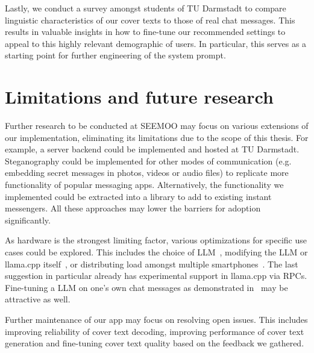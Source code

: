 Lastly, we conduct a survey amongst students of TU Darmstadt to compare linguistic characteristics of our cover texts to those of real chat messages. This results in valuable insights in how to fine-tune our recommended settings to appeal to this highly relevant demographic of users. In particular, this serves as a starting point for further engineering of the system prompt.

\section{Limitations and future research}
\label{sec:limitationsAndFutureResearch}
Further research to be conducted at SEEMOO may focus on various extensions of our implementation, eliminating its limitations due to the scope of this thesis. For example, a server backend could be implemented and hosted at TU Darmstadt. Steganography could be implemented for other modes of communication (e.g. embedding secret messages in photos, videos or audio files) to replicate more functionality of popular messaging apps. Alternatively, the functionality we implemented could be extracted into a library to add to existing instant messengers. All these approaches may lower the barriers for adoption significantly.

As hardware is the strongest limiting factor, various optimizations for specific use cases could be explored. This includes the choice of \gls{LLM}~\cite{eldanTinyStoriesHowSmall2023}, modifying the \gls{LLM} or llama.cpp itself~\cite{carreiraRevolutionizingMobileInteraction2023,chenOptimizationArmv9Architecture2024}, or distributing load amongst multiple smartphones~\cite{zhaoLinguaLinkedDistributedLarge2023}. The last suggestion in particular already has experimental support in llama.cpp via \glspl{RPC}. Fine-tuning a \gls{LLM} on one's own chat messages as demonstrated in~\cite{donnerSimulationMeFinetuning2024} may be attractive as well.

Further maintenance of our app may focus on resolving open issues. This includes improving reliability of cover text decoding, improving performance of cover text generation and fine-tuning cover text quality based on the feedback we gathered.
